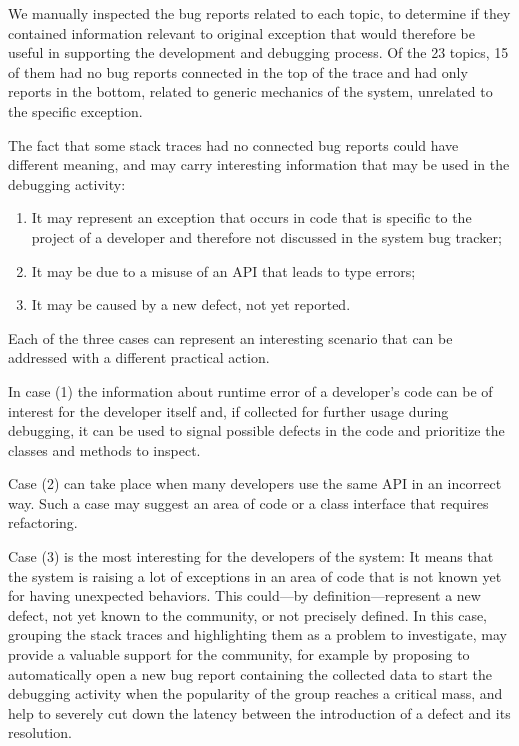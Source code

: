 We manually inspected the bug reports related to each topic, to determine if they contained information relevant to original exception that would therefore be useful in supporting the development and debugging process.
Of the 23 topics, 15 of them had no bug reports connected in the top of the trace and had only reports in the bottom, related to generic mechanics of the system, unrelated to the specific exception.

The fact that some stack traces had no connected bug reports could have different meaning, and may carry interesting information that may be used in the debugging activity:

\begin{enumerate}%

\item It may represent an exception that occurs in code that is specific to the project of a developer and therefore not discussed in the system bug tracker;

\item It may be due to a misuse of an API that leads to type errors;

\item It may be caused by a new defect, not yet reported.

\end{enumerate}

Each of the three cases can represent an interesting scenario that can be addressed with a different practical action.

In case (1) the information about runtime error of a developer's code can be of interest for the developer itself and, if collected for further usage during debugging, it can be used to signal possible defects in the code and prioritize the classes and methods to inspect.

Case (2) can take place when many developers use the same API in an incorrect way.
Such a case may suggest an area of code or a class interface that requires refactoring.

Case (3) is the most interesting for the developers of the system: It means that the system is raising a lot of exceptions in an area of code that is not known yet for having unexpected behaviors.
This could---by definition---represent a new defect, not yet known to the community, or not precisely defined.
In this case, grouping the stack traces and highlighting them as a problem to investigate, may provide a valuable support for the community, for example by proposing to automatically open a new bug report containing the collected data to start the debugging activity when the popularity of the group reaches a critical mass, and help to severely cut down the latency between the introduction of a defect and its resolution.

